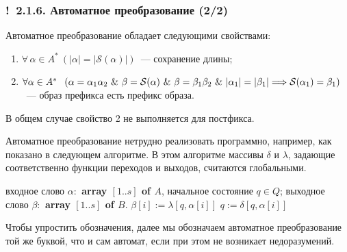 \documentclass[mathserif,12pt,aspectratio=169]{beamer}
\def\A#1#2{\forall\,#1\ \left(#2\right)}
\let\Impl\Longrightarrow
\def\And{\operatorname{\,\&\,}}
\def\Ok{{\color{green}\textbf{!}\ }}
\begin{document}
\begin{frame}
\frametitle{\Ok 2.1.6. Автоматное преобразование (2/2)}


Автоматное преобразование обладает следующими свойствами:
\begin{enumerate}
\item $\A{\alpha\in A^* }{|\alpha|=|\mathcal{S}(\alpha)|}$~---
сохранение длины;

\item $\forall\alpha\in A^*\kern6pt \left(\alpha=\alpha_1\alpha_2
 \And  \beta=\mathcal{S}(\alpha)\And
\beta=\beta_1\beta_2 \And|\alpha_1|=|\beta_1|
\Impl\mathcal{S}(\alpha_1)=\beta_1\right)$~--- образ префикса
есть префикс образа.
\end{enumerate}

\vspace{-2pt}
\begin{remark}
В общем случае свойство 2 не выполняется для постфикса.
\end{remark}

Автоматное преобразование нетрудно реализовать программно,
например, как показано в следующем алгоритме. 
В этом алгоритме
массивы $\delta$ и $\lambda$, задающие соответственно функции переходов и
выходов, считаются глобальными.

\begin{algorithmic}
\REQUIRE входное слово 
\textbf{$\alpha:$ array $[1..s]$ of $A$},
начальное состояние $q\in Q$;
\ENSURE выходное слово 
\textbf{$\beta:$ array $[1..s]$ of $B$}.
   \STATE $\beta[i]:=\lambda\left[q,\alpha[i]\right]$
   \STATE $q:=\delta\left[q,\alpha[i]\right]$
\ENDFOR
\end{algorithmic}


\begin{remark}
Чтобы упростить обозначения,
далее мы обозначаем
автоматное преобразование
той же буквой, что и сам автомат,
если при этом не возникает
недоразумений.
\end{remark}

\end{frame}
\end{document}
